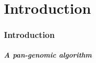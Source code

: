 \part{Introduction}
\section{Introduction}


\begin{frame}
	\partpage
	\centering
\end{frame}


\begin{frame}
	\frametitle{A pan-genomic algorithm}
	\centering
\end{frame}


